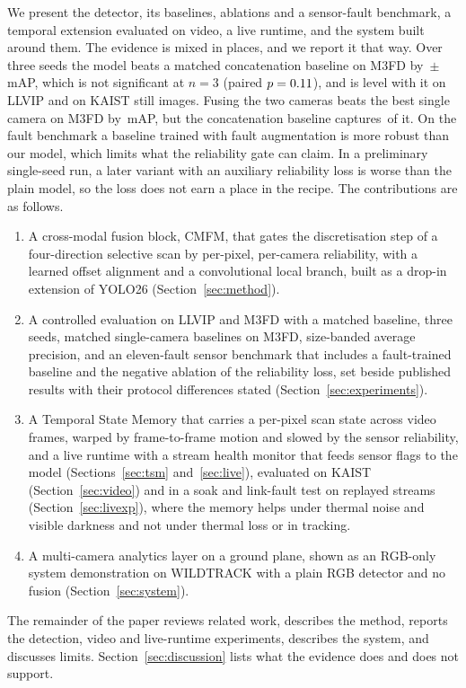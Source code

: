 We present the detector, its baselines, ablations and a sensor-fault benchmark, a temporal extension evaluated on video, a live runtime, and the system built around them. The evidence is mixed in places, and we report it that way. Over three seeds the model beats a matched concatenation baseline on M3FD by \marMfdVtwoVsConcatMdMeanMap{}\,$\pm$\,\marMfdVtwoVsConcatMdStdMap{} mAP, which is not significant at $n=3$ (paired $p=0.11{}$), and is level with it on LLVIP and on KAIST still images. Fusing the two cameras beats the best single camera on M3FD by \gainMfdCffmVtwoOverBestMeanMap{}\,mAP, but the concatenation baseline captures \gainMfdConcatMdOverBestMeanMap{}\,of it. On the fault benchmark a baseline trained with fault augmentation is more robust than our model, which limits what the reliability gate can claim. In a preliminary single-seed run, a later variant with an auxiliary reliability loss is worse than the plain model, so the loss does not earn a place in the recipe. The contributions are as follows.
\begin{enumerate}
\item A cross-modal fusion block, CMFM, that gates the discretisation step of a four-direction selective scan by per-pixel, per-camera reliability, with a learned offset alignment and a convolutional local branch, built as a drop-in extension of YOLO26 (Section~\ref{sec:method}).
\item A controlled evaluation on LLVIP and M3FD with a matched baseline, three seeds, matched single-camera baselines on M3FD, size-banded average precision, and an eleven-fault sensor benchmark that includes a fault-trained baseline and the negative ablation of the reliability loss, set beside published results with their protocol differences stated (Section~\ref{sec:experiments}).
\item A Temporal State Memory that carries a per-pixel scan state across video frames, warped by frame-to-frame motion and slowed by the sensor reliability, and a live runtime with a stream health monitor that feeds sensor flags to the model (Sections~\ref{sec:tsm} and~\ref{sec:live}), evaluated on KAIST (Section~\ref{sec:video}) and in a soak and link-fault test on replayed streams (Section~\ref{sec:livexp}), where the memory helps under thermal noise and visible darkness and not under thermal loss or in tracking.
\item A multi-camera analytics layer on a ground plane, shown as an RGB-only system demonstration on WILDTRACK with a plain RGB detector and no fusion (Section~\ref{sec:system}).
\end{enumerate}
The remainder of the paper reviews related work, describes the method, reports the detection, video and live-runtime experiments, describes the system, and discusses limits. Section~\ref{sec:discussion} lists what the evidence does and does not support.
